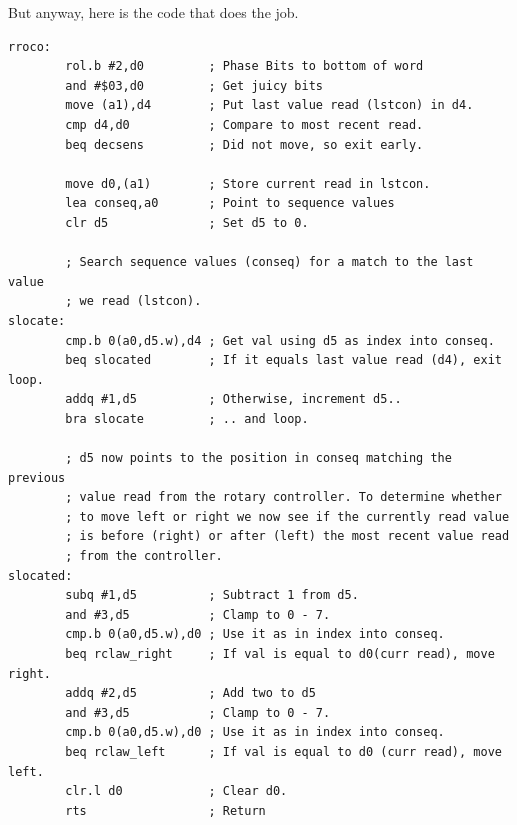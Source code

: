 But anyway, here is the code that does the job.
\clearpage
\begin{lstlisting}
rroco:
        rol.b #2,d0         ; Phase Bits to bottom of word
        and #$03,d0         ; Get juicy bits
        move (a1),d4        ; Put last value read (lstcon) in d4.
        cmp d4,d0           ; Compare to most recent read.
        beq decsens         ; Did not move, so exit early.

        move d0,(a1)        ; Store current read in lstcon.
        lea conseq,a0       ; Point to sequence values
        clr d5              ; Set d5 to 0.

        ; Search sequence values (conseq) for a match to the last value
        ; we read (lstcon).
slocate:
        cmp.b 0(a0,d5.w),d4 ; Get val using d5 as index into conseq.
        beq slocated        ; If it equals last value read (d4), exit loop.
        addq #1,d5          ; Otherwise, increment d5..
        bra slocate         ; .. and loop.
    
        ; d5 now points to the position in conseq matching the previous
        ; value read from the rotary controller. To determine whether 
        ; to move left or right we now see if the currently read value
        ; is before (right) or after (left) the most recent value read
        ; from the controller.
slocated:
        subq #1,d5          ; Subtract 1 from d5.
        and #3,d5           ; Clamp to 0 - 7.
        cmp.b 0(a0,d5.w),d0 ; Use it as in index into conseq.
        beq rclaw_right     ; If val is equal to d0(curr read), move right.
        addq #2,d5          ; Add two to d5
        and #3,d5           ; Clamp to 0 - 7.
        cmp.b 0(a0,d5.w),d0 ; Use it as in index into conseq.
        beq rclaw_left      ; If val is equal to d0 (curr read), move left.
        clr.l d0            ; Clear d0.
        rts                 ; Return
\end{lstlisting}
